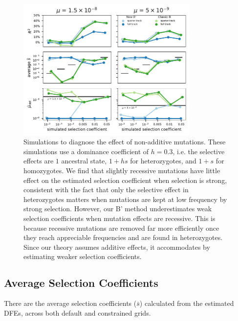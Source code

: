\documentclass[11pt]{article}
\begin{document}
\begin{figure}[htbp]
  \centering
  \includegraphics[width=0.8\textwidth]{figures/supplementary/subfigure_sim_mle_recessive.pdf}

  \caption{Simulations to diagnose the effect of non-additive mutations. These
      simulations use a dominance coefficient of $h=0.3$, i.e. the selective
      effects are $1$ ancestral state, $1+hs$ for heterozygotes, and $1+s$ for
      homozygotes. We find that slightly recessive mutations have little effect
      on the estimated selection coefficient when selection is strong,
      consistent with the fact that only the selective effect in heterozygotes
      matters when mutations are kept at low frequency by strong selection.
      However, our B' method underestimates weak selection coefficients when
      mutation effects are recessive. This is because recessive mutations are
      removed far more efficiently once they reach appreciable frequencies and
      are found in heterozygotes. Since our theory assumes additive effects, it
      accommodates by estimating weaker selection coefficients.}

  \label{suppfig:sim-rec}
\end{figure}

\subsection{Average Selection Coefficients}

There are the average selection coefficients ($\bar{s}$) calculated from the
estimated DFEs, across both default and constrained grids.
\end{document}
